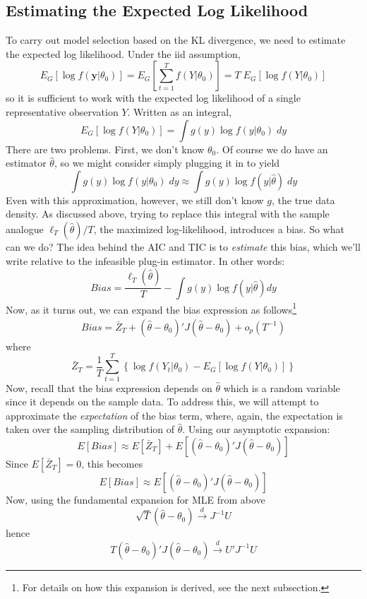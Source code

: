 \documentclass[12pt]{article}
\theoremstyle{definition}
\begin{document}
\subsection{Estimating the Expected Log Likelihood}
To carry out model selection based on the KL divergence, we need to estimate the expected log likelihood. Under the iid assumption,
$$E_G[\log f(\mathbf{y}|\theta_0)] = E_G\left[\sum_{t=1}^T f(Y|\theta_0) \right] = T \; E_G[\log f(Y|\theta_0)]$$
so it is sufficient to work with the expected log likelihood of a single representative observation $Y$. Written as an integral,
$$E_G[\log f(Y|\theta_0)] = \int g(y) \log f(y|\theta_0) \; dy$$
There are two problems. First, we don't know $\theta_0$. Of course we do have an estimator $\widehat{\theta}$, so we might consider simply plugging it in to yield
$$\int g(y) \log f(y|\theta_0) \; dy \approx \int g(y) \log f(y|\widehat{\theta}) \; dy$$
Even with this approximation, however, we still don't know $g$, the true data density. As discussed above, trying to replace this integral with the sample analogue $\ell_T(\widehat{\theta})/T$, the maximized log-likelihood, introduces a bias. So what can we do? The idea behind the AIC and TIC is to \emph{estimate} this bias, which we'll write relative to the infeasible plug-in estimator. In other words:
$$Bias = \frac{\ell_T(\widehat{\theta})}{T} - \int g(y) \log f(y|\widehat{\theta}) dy$$
Now, as it turns out, we can expand the bias expression as follows\footnote{For details on how this expansion is derived, see the next subsection.}
\begin{eqnarray*}
Bias = \bar{Z}_T + (\widehat{\theta} - \theta_0)' J (\widehat{\theta} - \theta_0) + o_p(T^{-1})
\end{eqnarray*}
where
$$\bar{Z}_T = \frac{1}{T} \sum_{t=1}^T\left\{ \log f(Y_t|\theta_0) - E_G[\log f(Y|\theta_0)] \right\}$$
Now, recall that the bias expression depends on $\widehat{\theta}$ which is a random variable since it depends on the sample data. To address this, we will attempt to approximate the \emph{expectation} of the bias term, where, again, the expectation is taken over the sampling distribution of $\widehat{\theta}$. Using our asymptotic expansion:
$$E[Bias] \approx E[\bar{Z}_T] + E[(\widehat{\theta} - \theta_0)' J (\widehat{\theta} - \theta_0)]$$
Since $E[\bar{Z}_T] = 0$, this becomes
$$E[Bias] \approx E[(\widehat{\theta} - \theta_0)' J (\widehat{\theta} - \theta_0)]$$
Now, using the fundamental expansion for MLE from above
$$\sqrt{T}\left(\widehat{\theta} - \theta_0 \right) \overset{d}{\rightarrow} J^{-1}U$$
hence
$$T\left(\widehat{\theta} - \theta_0 \right)'J\left(\widehat{\theta} - \theta_0 \right) \overset{d}{\rightarrow} U' J^{-1} U$$
\end{document}
